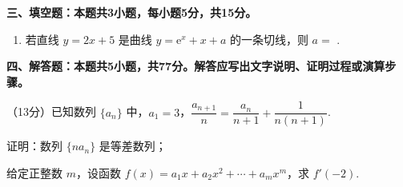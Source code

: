 \documentclass[12pt, a4paper, oneside]{ctexart}
\newcommand{\blank}{\underline{\hspace{2cm}}}
\begin{document}

\noindent\textbf{三、填空题：本题共3小题，每小题5分，共15分。}

\begin{enumerate}[start=12, itemsep=0.8em]
    \item 若直线 $y=2x+5$ 是曲线 $y=\mathrm{e}^x+x+a$ 的一条切线，则 $a=$ \blank.
\end{enumerate}


\noindent\textbf{四、解答题：本题共5小题，共77分。解答应写出文字说明、证明过程或演算步骤。}

\begin{examenum}[start=15, itemsep=2.5cm]
    \item （13分）已知数列 $\{a_n\}$ 中，$a_1=3$，$\dfrac{a_{n+1}}{n}=\dfrac{a_n}{n+1}+\dfrac{1}{n(n+1)}$.
    \begin{examenum}
        \item 证明：数列 $\{na_n\}$ 是等差数列；
        \item 给定正整数 $m$，设函数 $f(x)=a_1x+a_2x^2+\cdots+a_mx^m$，求 $f'(-2)$.
    \end{examenum}
\end{examenum}
\end{document}
